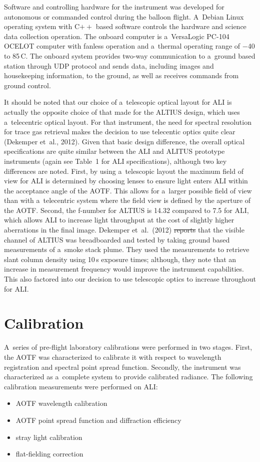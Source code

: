 \documentclass[amtd, online, hvmath]{copernicus}
\providecommand{\DIFadd}[1]{{\protect\color{blue}\uwave{#1}}} %
\providecommand{\DIFdel}[1]{{\protect\color{red}\sout{#1}}}                      %
\providecommand{\DIFaddbegin}{} %
\providecommand{\DIFaddend}{} %
\providecommand{\DIFdelbegin}{} %
\providecommand{\DIFdelend}{} %
\begin{document}
Software and controlling hardware for the instrument was developed for
autonomous or commanded control during the balloon flight. A~Debian
Linux operating system with C$++$ based software controls the hardware
and science data collection operation. The onboard computer is
a~VersaLogic PC-104 OCELOT computer with fanless operation and
a~thermal operating range of $-$40 to 85\,{\degree}C. The onboard
system provides two-way communication to a~ground based station
through UDP protocol and sends data, including images and housekeeping
information, to the ground, as well as receives commands from ground
control.

It should be noted that our choice of a~telescopic optical layout for ALI is
actually the opposite choice of that made for the ALTIUS design, which uses
a~telecentric optical layout. For that instrument, the need for spectral
resolution for trace gas retrieval makes the decision to use telecentic
optics quite clear (Dekemper et~al., 2012). Given that basic design
difference, the overall optical specifications are quite similar between the
ALI and ALITUS prototype instruments (again see Table~1 for ALI
specifications), although two key differences are noted. First, by using
a~telescopic layout the maximum field of view for ALI is determined by
choosing lenses to ensure light enters ALI within the acceptance angle of the
AOTF. This allows for a~larger possible field of view than with a~telecentric
system where the field view is defined by the aperture of the AOTF. Second,
the f-number for ALTIUS is 14.32 compared to 7.5 for ALI, which allows ALI to
increase light throughput at the cost of slightly higher aberrations in the
final image. Dekemper et~al.~(2012) \DIFdelbegin \DIFdel{reports }\DIFdelend \DIFaddbegin \DIFadd{report }\DIFaddend that the visible channel of
ALTIUS was breadboarded and tested by taking ground based measurements of
a~smoke stack plume. They used the measurements to retrieve  slant
column density using 10\,s exposure times; although, they note that an
increase in measurement frequency would improve the instrument capabilities.
This also factored into our decision to use telescopic optics to increase
throughout for ALI.

\section{Calibration}

A~series of pre-flight laboratory calibrations were performed in two
stages.  First, the AOTF was characterized to calibrate it with
respect to wavelength registration and spectral point spread
function. Secondly, the instrument was characterized as a~complete
system to provide calibrated radiance. The following calibration
measurements were performed on ALI:
\begin{itemize}
\item AOTF wavelength calibration
\item AOTF point spread function and diffraction efficiency
\item stray light calibration
\item flat-fielding correction
\end{itemize}
\end{document}
